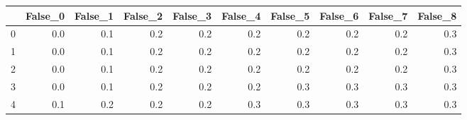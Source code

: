 \begin{tabular}{lrrrrrrrrr}
\toprule
{} &  False\_0 &  False\_1 &  False\_2 &  False\_3 &  False\_4 &  False\_5 &  False\_6 &  False\_7 &  False\_8 \\ \hline
\midrule
0 &      0.0 &      0.1 &      0.2 &      0.2 &      0.2 &      0.2 &      0.2 &      0.2 &      0.3 \\ \hline
1 &      0.0 &      0.1 &      0.2 &      0.2 &      0.2 &      0.2 &      0.2 &      0.2 &      0.3 \\ \hline
2 &      0.0 &      0.1 &      0.2 &      0.2 &      0.2 &      0.2 &      0.2 &      0.2 &      0.3 \\ \hline
3 &      0.0 &      0.1 &      0.2 &      0.2 &      0.2 &      0.3 &      0.3 &      0.3 &      0.3 \\ \hline
4 &      0.1 &      0.2 &      0.2 &      0.2 &      0.3 &      0.3 &      0.3 &      0.3 &      0.3 \\ \hline
\bottomrule
\end{tabular}
